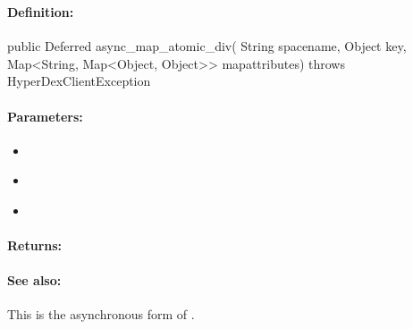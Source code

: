 \pagebreak
\subsubsection{}
\label{api:java:async_map_atomic_div}


\paragraph{Definition:}
\begin{javacode}
public Deferred async_map_atomic_div(
        String spacename,
        Object key,
        Map<String, Map<Object, Object>> mapattributes) throws HyperDexClientException
\end{javacode}

\paragraph{Parameters:}
\begin{itemize}[noitemsep]
\item {}\\

\item {}\\

\item {}\\

\end{itemize}

\paragraph{Returns:}


\paragraph{See also:}  This is the asynchronous form of .

\pagebreak
\subsubsection{}
\label{api:java:cond_map_atomic_div}


